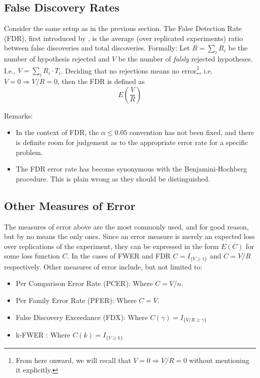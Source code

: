 \documentclass[draft,12pt]{article}
\begin{document}
\subsection{False Discovery Rates}
Consider the same setup as in the previous section. The False Detection Rate (FDR), first introduced by \citet{benjamini_controlling_1995}, is the average (over replicated experiments) ratio between false discoveries and total discoveries.
Formally: Let $R=\sum_i{R_i}$ be the number of hypothesis rejected and $V$ be the number of \emph{falsly} rejected hypotheses. I.e., $V=\sum_i{R_i \cdot T_i}$. Deciding that no rejections means no error\footnote{ From here onward, we will recall that $V=0 \Rightarrow V/R=0$ without mentioning it explicitly.}, i.e.  $V=0 \Rightarrow V/R=0$, then the FDR is defined as $$E \left( \frac{V}{R} \right)$$

Remarks:
\begin{itemize}
\item In the context of FDR, the $\alpha \leq 0.05$ convention has not been fixed, and there is definite room for judgement as to the appropriate error rate for a specific problem.
\item The FDR error rate has become synonymous with the Benjamini-Hochberg procedure. This is plain wrong as they should be distinguished.
\end{itemize}




\subsection{Other Measures of Error}
The measures of error above are the most commonly used, and for good reason, but by no means the only ones. Since an error measure is merely an expected loss over replications of the experiment, they can be expressed in the form $E(C)$ for some loss function $C$. In the cases of FWER and FDR $C = I_{\{ V \geq 1 \} } $ and $C = V/R$ respectively.
Other measures of error include, but not limited to:

\begin{itemize}
\item Per Comparison Error Rate (PCER): Where $C=V/n$.
\item Per Family Error Rate (PFER): Where $C=V$.
\item False Discovery Exceedance (FDX)\citep{genovese_exceedance_2006}: Where $C(\gamma) = I_{\{ V/R \geq \gamma \} }$
\item k-FWER \citep{van_der_laan_augmentation_2004}: Where $C(k) = I_{\{ V \geq k \} }$
\end{itemize}
\end{document}
